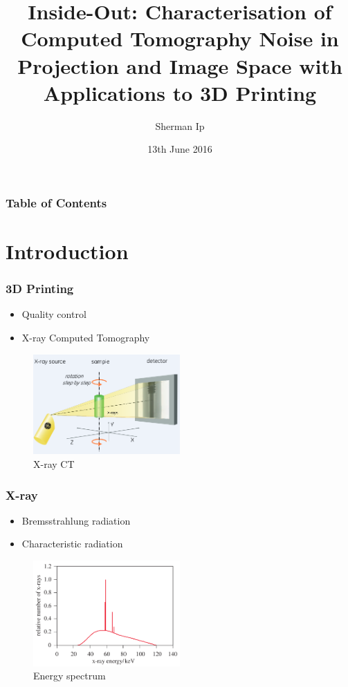 \documentclass{beamer}
\title{Inside-Out: Characterisation of Computed Tomography Noise in Projection and Image Space with Applications to 3D Printing}
\author{Sherman Ip}
\institute{University of Warwick}
\date{13th June 2016}
\begin{document}
\frame{\titlepage}

\begin{frame}
\frametitle{Table of Contents}
\tableofcontents
\end{frame}

\section{Introduction}

\begin{frame}
\frametitle{3D Printing}
\begin{itemize}
	\item Quality control
	\pause
	\item X-ray Computed Tomography
\end{itemize}
\begin{figure}
	\includegraphics[width=0.5\textwidth]{figures/x_ray_ct.png}
	\caption{X-ray CT}
\end{figure}
\end{frame}

\begin{frame}
\frametitle{X-ray}
\begin{itemize}
	\item Bremsstrahlung radiation
	\item Characteristic radiation
\end{itemize}
\begin{figure}
	\includegraphics[width=0.5\textwidth]{figures/x_ray_spectrum.png}
	\caption{Energy spectrum}
\end{figure}
\end{frame}
\end{document}
